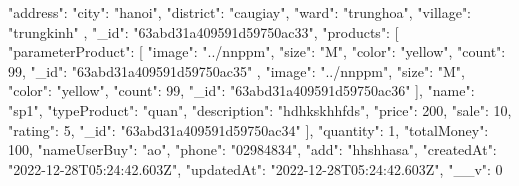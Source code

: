 {                    {
                        "address": {
                            "city": "hanoi",
                            "district": "caugiay",
                            "ward": "trunghoa",
                            "village": "trungkinh"
                            },
                            "_id": "63abd31a409591d59750ac33",
                            "products": [
                                {
                                    "parameterProduct": [
                {
                    "image": "../nnppm",
                    "size": "M",
                    "color": "yellow",
                    "count": 99,
                    "_id": "63abd31a409591d59750ac35"
                    },
                    {
                        "image": "../nnppm",
                        "size": "M",
                        "color": "yellow",
                        "count": 99,
                        "_id": "63abd31a409591d59750ac36"
                        }
                        ],
                        "name": "sp1",
                        "typeProduct": "quan",
                        "description": "hdhkskhhfds",
                        "price": 200,
                        "sale": 10,
                        "rating": 5,
                        "_id": "63abd31a409591d59750ac34"
                        }
                        ],
                        "quantity": 1,
                        "totalMoney": 100,
                        "nameUserBuy": "ao",
                        "phone": "02984834",
                        "add": "hhshhasa",
                        "createdAt": "2022-12-28T05:24:42.603Z",
                        "updatedAt": "2022-12-28T05:24:42.603Z",
                        "__v": 0
    }
}